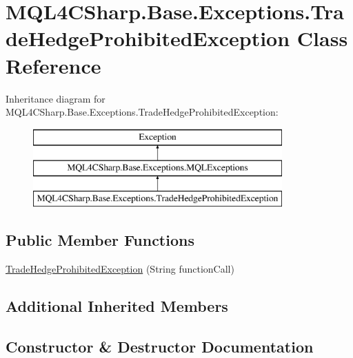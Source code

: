 \hypertarget{class_m_q_l4_c_sharp_1_1_base_1_1_exceptions_1_1_trade_hedge_prohibited_exception}{}\section{M\+Q\+L4\+C\+Sharp.\+Base.\+Exceptions.\+Trade\+Hedge\+Prohibited\+Exception Class Reference}
\label{class_m_q_l4_c_sharp_1_1_base_1_1_exceptions_1_1_trade_hedge_prohibited_exception}
Inheritance diagram for M\+Q\+L4\+C\+Sharp.\+Base.\+Exceptions.\+Trade\+Hedge\+Prohibited\+Exception\+:\begin{figure}[H]
\begin{center}
\leavevmode
\includegraphics[height=3.000000cm]{class_m_q_l4_c_sharp_1_1_base_1_1_exceptions_1_1_trade_hedge_prohibited_exception}
\end{center}
\end{figure}
\subsection*{Public Member Functions}
\begin{DoxyCompactItemize}
\item 
\hyperlink{class_m_q_l4_c_sharp_1_1_base_1_1_exceptions_1_1_trade_hedge_prohibited_exception_a3a84989918c76d10e6ace948cb6e149d}{Trade\+Hedge\+Prohibited\+Exception} (String function\+Call)
\end{DoxyCompactItemize}
\subsection*{Additional Inherited Members}


\subsection{Constructor \& Destructor Documentation}
